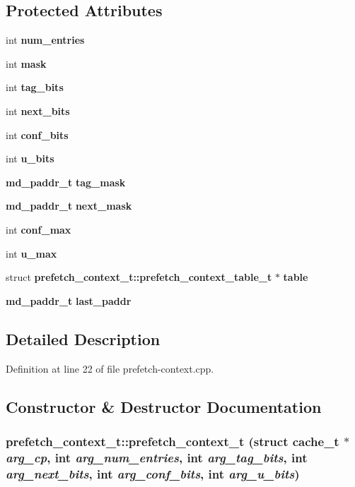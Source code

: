 \subsection*{Protected Attributes}
\begin{CompactItemize}
\item 
int {\bf num\_\-entries}
\item 
int {\bf mask}
\item 
int {\bf tag\_\-bits}
\item 
int {\bf next\_\-bits}
\item 
int {\bf conf\_\-bits}
\item 
int {\bf u\_\-bits}
\item 
{\bf md\_\-paddr\_\-t} {\bf tag\_\-mask}
\item 
{\bf md\_\-paddr\_\-t} {\bf next\_\-mask}
\item 
int {\bf conf\_\-max}
\item 
int {\bf u\_\-max}
\item 
struct {\bf prefetch\_\-context\_\-t::prefetch\_\-context\_\-table\_\-t} $\ast$ {\bf table}
\item 
{\bf md\_\-paddr\_\-t} {\bf last\_\-paddr}
\end{CompactItemize}


\subsection{Detailed Description}


Definition at line 22 of file prefetch-context.cpp.

\subsection{Constructor \& Destructor Documentation}
\subsubsection[{prefetch\_\-context\_\-t}]{\setlength{\rightskip}{0pt plus 5cm}prefetch\_\-context\_\-t::prefetch\_\-context\_\-t (struct {\bf cache\_\-t} $\ast$ {\em arg\_\-cp}, \/  int {\em arg\_\-num\_\-entries}, \/  int {\em arg\_\-tag\_\-bits}, \/  int {\em arg\_\-next\_\-bits}, \/  int {\em arg\_\-conf\_\-bits}, \/  int {\em arg\_\-u\_\-bits})\hspace{0.3cm}{\tt  [inline]}}\label{classprefetch__context__t_02c961d12e2907c5d83e9db53ec8c51e}





